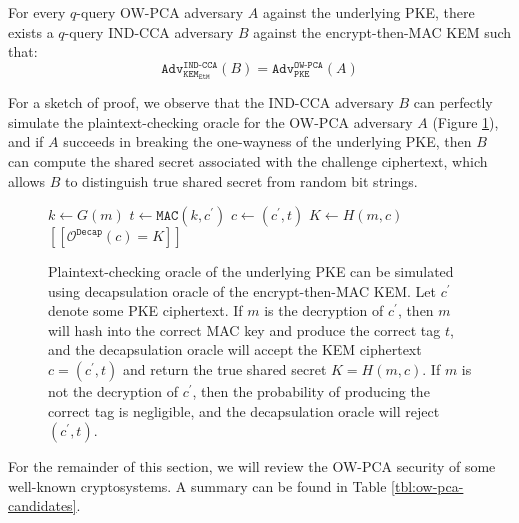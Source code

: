 \documentclass[runningheads]{llncs}
\newcommand{\pke}{\texttt{PKE}}
\newcommand{\kem}{\texttt{KEM}}
\newcommand{\decap}{\texttt{Decap}}
\newcommand{\etm}{\texttt{EtM}}  %
\newcommand{\mac}{\texttt{MAC}}
\newcommand{\pco}{\texttt{PCO}}
\newcommand{\llbrack}{[\![}
\newcommand{\rrbrack}{]\!]}
\newcommand{\adv}{\texttt{Adv}}
\begin{document}
\begin{lemma}\label{lemma:ind-cca-implies-ow-pca}
    For every $q$-query OW-PCA adversary $A$ against the underlying PKE, there exists a $q$-query IND-CCA adversary $B$ against the encrypt-then-MAC KEM such that:
    \begin{equation*}
        \adv^\texttt{IND-CCA}_{\kem_\etm}(B) = \adv^\texttt{OW-PCA}_{\pke}(A)
    \end{equation*}
\end{lemma}

For a sketch of proof, we observe that the IND-CCA adversary $B$ can perfectly simulate the plaintext-checking oracle for the OW-PCA adversary $A$ (Figure \ref{fig:simulate-pca-oracle-with-cca-oracle}), and if $A$ succeeds in breaking the one-wayness of the underlying PKE, then $B$ can compute the shared secret associated with the challenge ciphertext, which allows $B$ to distinguish true shared secret from random bit strings.

\begin{figure}[h]
    \centering
    \begin{minipage}[t]{0.4\textwidth}
        \begin{algorithm}[H]
            \caption*{$\mathcal{O}^\pco_\decap(m, c^\prime)$}
            \begin{algorithmic}[1]
                \State $k \leftarrow G(m)$
                \State $t \leftarrow \mac(k, c^\prime)$
                \State $c \leftarrow (c^\prime, t)$
                \State $K \leftarrow H(m, c)$
                \State \Return $\llbrack \mathcal{O}^\decap(c) = K\rrbrack$
            \end{algorithmic}
        \end{algorithm}
    \end{minipage}
    \caption{Plaintext-checking oracle of the underlying PKE can be simulated using decapsulation oracle of the encrypt-then-MAC KEM. Let $c^\prime$ denote some PKE ciphertext. If $m$ is the decryption of $c^\prime$, then $m$ will hash into the correct MAC key and produce the correct tag $t$, and the decapsulation oracle will accept the KEM ciphertext $c = (c^\prime, t)$ and return the true shared secret $K = H(m, c)$. If $m$ is not the decryption of $c^\prime$, then the probability of producing the correct tag is negligible, and the decapsulation oracle will reject $(c^\prime, t)$.}\label{fig:simulate-pca-oracle-with-cca-oracle}
\end{figure}

For the remainder of this section, we will review the OW-PCA security of some well-known cryptosystems. A summary can be found in Table \ref{tbl:ow-pca-candidates}.
\end{document}
